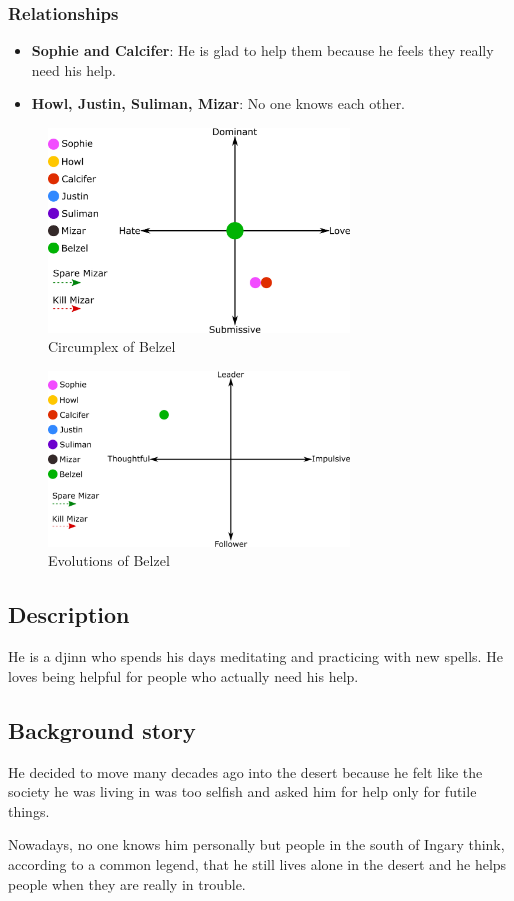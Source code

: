 \subsubsection*{Relationships}
\begin{itemize}
\item \textbf{Sophie and Calcifer}: He is glad to help them because he feels they really need his help.
\item \textbf{Howl, Justin, Suliman, Mizar}: No one knows each other.
\end{itemize}

\begin{figure}[H]
  \centering
  \includegraphics[width=8cm]{Images/SVG/Exported/Circumplexes/belzelCircumplex}
  \caption{Circumplex of Belzel}
\end{figure}

\begin{figure}[H]
   \centering
   \includegraphics[width=8cm]{Images/SVG/Exported/Evolutions/belzelEvolution}
   \caption{Evolutions of Belzel}
\end{figure}

\subsection{Description}
He is a djinn who spends his days meditating and practicing with new spells. He loves being helpful for people who actually need his help.

\subsection{Background story}
He decided to move many decades ago into the desert because he felt like the society he was living in was too selfish and asked him for help only for futile things.

Nowadays, no one knows him personally but people in the south of Ingary think, according to a common legend, that he still lives alone in the desert and he helps people when they are really in trouble.

